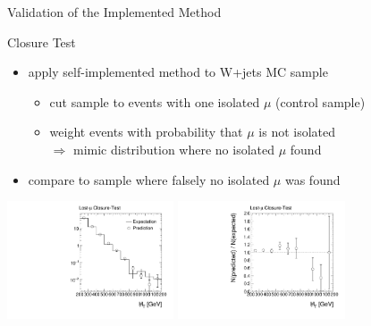 \begin{frame}{Validation of the Implemented Method}

\begin{block}{Closure Test}
\begin{itemize}
\item apply self-implemented method to W+jets MC sample\\
\begin{itemize}
	\item cut sample to events with one isolated $\mu$ (control sample)
	\item weight events with probability that $\mu$ is not isolated\\
	$\Rightarrow$ mimic distribution where no isolated $\mu$ found 
\end{itemize}
\item compare to sample where falsely no isolated $\mu$ was found
\end{itemize}
\end{block}

\begin{center}
\includegraphics[width = 0.37\textwidth]{plots11/LLClosureMHT.pdf}
\includegraphics[width = 0.37\textwidth]{plots11/LLClosureMHTRatio.pdf}
\end{center}

\end{frame}


